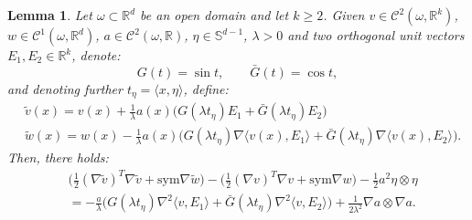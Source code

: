 \documentclass[reqno,twoside,11pt]{amsart}
\newcommand{\sym}{\mathrm{sym}}
\newcommand{\R}{\mathbb{R}}
\numberwithin{equation}{section}
\theoremstyle{plain}
\newtheorem{lemma}[theorem]{Lemma}
\theoremstyle{definition}
\begin{document}
\begin{lemma}\label{lem_stepK}
Let $\omega\subset\R^d$ be an open domain and let $k\geq 2$. 
Given $v\in \mathcal{C}^2(\omega, \R^{k})$, $w\in
\mathcal{C}^1(\omega, \R^{d})$, $a\in \mathcal{C}^2(\omega,\R)$,
$\eta\in\mathbb{S}^{d-1}$, $\lambda>0$
and two orthogonal unit vectors $E_1, E_2\in\R^k$, 
denote:
$$G(t) = \sin t, \qquad \bar G(t) = \cos t,$$ 
and denoting further $t_\eta = \langle x,\eta\rangle$, define:
\begin{equation}\label{defi_perK}
\begin{split}
&\tilde v(x) = v(x) + \frac{1}{\lambda} a(x)
\Big(G(\lambda t_{\eta})E_1 +\bar G(\lambda t_{\eta})E_2\Big)  \\
& \tilde w(x) = w(x) -\frac{1}{\lambda} a(x)\Big(G(\lambda
t_{\eta})\nabla \langle v(x), E_1\rangle +
\bar G(\lambda t_{\eta})\nabla \langle v(x), E_2\rangle\Big).
\end{split}
\end{equation}
Then, there holds:
\begin{equation}\label{step_errK}
\begin{split}
& \big(\frac{1}{2}(\nabla \tilde v)^T \nabla \tilde v + \sym\nabla \tilde w\big) - 
\big(\frac{1}{2}(\nabla v)^T \nabla v + \sym\nabla w\big) - \frac{1}{2} a^2\eta\otimes\eta
\\ & = -\frac{a}{\lambda} \Big(G(\lambda t_{\eta})\nabla^2 \langle v, E_1\rangle +
\bar G(\lambda t_{\eta})\nabla^2 \langle v, E_2\rangle\Big) +
\frac{1}{2\lambda^2} \nabla a\otimes \nabla a.
\end{split}
\end{equation}
\end{lemma}
\end{document}
